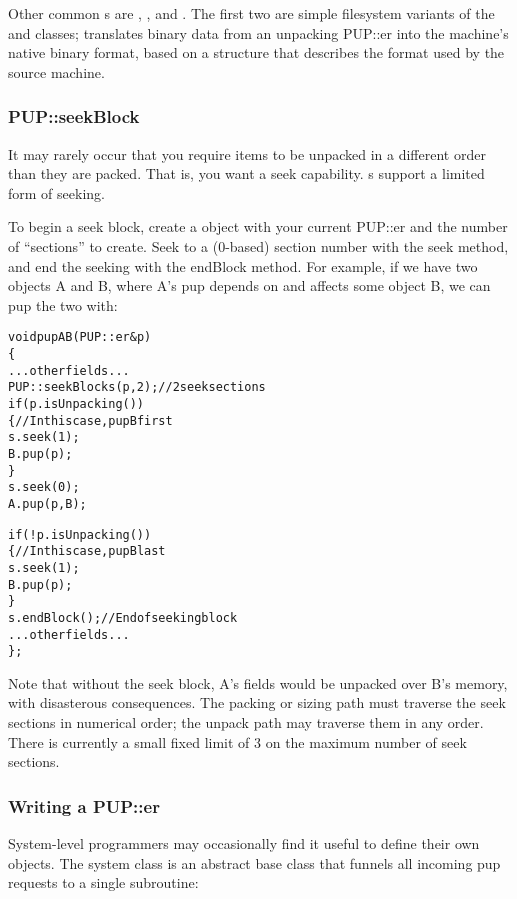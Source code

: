 Other common s are , 
, and .  The first
two are simple filesystem variants of the  
and  classes;  translates
binary data from an unpacking PUP::er into the machine's
native binary format, based on a  structure
that describes the format used by the source machine.


\subsubsection{PUP::seekBlock}

It may rarely occur that you require items to be unpacked
in a different order than they are packed.  That is, you
want a seek capability.  s support a limited 
form of seeking.

To begin a seek block, create a  object
with your current PUP::er and the number of ``sections'' to 
create.  Seek to a (0-based) section number
with the seek method, and end the seeking with the endBlock method.
For example, if we have two objects A and B, where A's pup
depends on and affects some object B, we can pup the two with:

\begin{alltt}
void pupAB(PUP::er &p)
\{
  ... other fields ...
  PUP::seekBlock s(p,2); //2 seek sections
  if (p.isUnpacking()) 
  \{//In this case, pup B first
    s.seek(1);
    B.pup(p);
  \}
  s.seek(0);
  A.pup(p,B);
  
  if (!p.isUnpacking()) 
  \{//In this case, pup B last
    s.seek(1);
    B.pup(p);
  \}
  s.endBlock(); //End of seeking block
  ... other fields ...
\};
\end{alltt}

Note that without the seek block, A's fields would be unpacked
over B's memory, with disasterous consequences.
The packing or sizing path must traverse the seek sections
in numerical order; the unpack path may traverse them in any
order.  There is currently a small fixed limit of 3 on the 
maximum number of seek sections.


\subsubsection{Writing a PUP::er}

System-level programmers may occasionally find it useful to define
their own  objects.  The system  class is 
an abstract base class that funnels all incoming pup requests
to a single subroutine:


